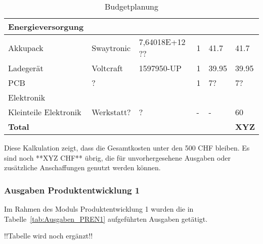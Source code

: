 \documentclass[main.tex]{subfiles} %
\begin{document}
\begin{table}[h]
\begin{tabular}{|p{3cm}|p{3cm}|p{3cm}|p{1cm}|p{1.5cm}|p{1cm}|}
        \rowcolor{lightgray} Energieversorgung &                        &                                 &                     &                            &                                 \\ \hline
        Akkupack                               & Swaytronic             & 7,64018E+12 ??                  & 1                   & 41.7                       & 41.7                            \\ \hline
        Ladegerät                              & Voltcraft              & 1597950-UP                      & 1                   & 39.95                      & 39.95                           \\ \hline
        PCB                                    & ?                      &                                 & 1                   & 7?                         & 7?                              \\ \hline
        \rowcolor{lightgray} Elektronik        &                        &                                 &                     &                            &                                 \\ \hline
        Kleinteile Elektronik                  & Werkstatt?             & ?                               & -                   & -                          & 60                              \\ \hline
        \textbf{Total}                         &                        &                                 &                     &                            & \textbf{XYZ}                   \\ \hline
    \end{tabular}
    \caption{Budgetplanung}
    \label{tab:Budgetplanung}
\end{table}

Diese Kalkulation zeigt, dass die Gesamtkosten unter den 500 CHF bleiben. Es sind noch **XYZ CHF** übrig,
    die für unvorhergesehene Ausgaben oder zusätzliche Anschaffungen genutzt werden können.






\subsubsection{Ausgaben Produktentwicklung 1}
Im Rahmen des Moduls Produktentwicklung 1 wurden die in Tabelle~\ref{tab:Ausgaben_PREN1} aufgeführten
Ausgaben getätigt.


!!Tabelle wird noch ergänzt!!
\end{document}
